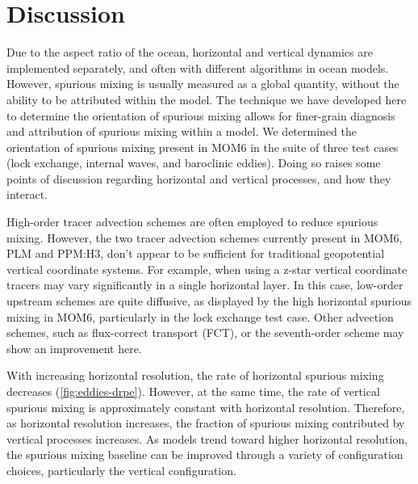\section{Discussion}
Due to the aspect ratio of the ocean, horizontal and vertical dynamics are implemented separately, and often with different algorithms in ocean models. However, spurious mixing is usually measured as a global quantity, without the ability to be attributed within the model. The technique we have developed here to determine the orientation of spurious mixing allows for finer-grain diagnosis and attribution of spurious mixing within a model. We determined the orientation of spurious mixing present in MOM6 in the suite of three test cases (lock exchange, internal waves, and baroclinic eddies). Doing so raises some points of discussion regarding horizontal and vertical processes, and how they interact.

High-order tracer advection schemes are often employed to reduce spurious mixing. However, the two tracer advection schemes currently present in MOM6, PLM and PPM:H3, don't appear to be sufficient for traditional geopotential vertical coordinate systems. For example, when using a z-star vertical coordinate tracers may vary significantly in a single horizontal layer. In this case, low-order upstream schemes are quite diffusive, as displayed by the high horizontal spurious mixing in MOM6, particularly in the lock exchange test case. Other advection schemes, such as flux-correct transport (FCT), or the seventh-order scheme may show an improvement here.

With increasing horizontal resolution, the rate of horizontal spurious mixing decreases (\cref{fig:eddies-drpe}). However, at the same time, the rate of vertical spurious mixing is approximately constant with horizontal resolution. Therefore, as horizontal resolution increases, the fraction of spurious mixing contributed by vertical processes increases. As models trend toward higher horizontal resolution, the spurious mixing baseline can be improved through a variety of configuration choices, particularly the vertical configuration.

